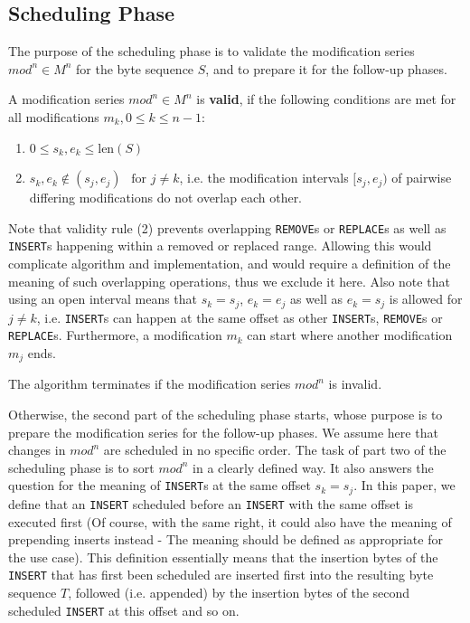 \documentclass[english, 10pt, openright, twocolumn, landscape, twoside, notitlepage, a4paper, pdftex]		
{article}
\begin{document}
\subsection{Scheduling Phase}%
\label{sec:SchedulingPhase}%

The purpose of the scheduling phase is to validate the modification series $mod^{n}\in M^{n}$ for the byte sequence $S$, and to prepare it for the follow-up phases.

A modification series $mod^{n}\in M^{n}$ is \textbf{valid}, if the following conditions are met for all modifications $m_{k}, 0\leq k\leq n-1$:
\begin{enumerate}
\item $0\leq s_{k},e_{k}\leq \text{len}(S)$
\item $s_{k},e_{k}\notin(s_{j}, e_{j})\ \ \text{ for } j\neq k$, i.e. the modification intervals $[s_{j}, e_{j})$ of pairwise differing modifications do not overlap each other.
\end{enumerate}

Note that validity rule (2) prevents overlapping \texttt{REMOVE}s or \texttt{REPLACE}s as well as \texttt{INSERT}s happening within a removed or replaced range. Allowing this would complicate algorithm and implementation, and would require a definition of the meaning of such overlapping operations, thus we exclude it here. Also note that using an open interval means that $s_{k}=s_{j}$, $e_{k}=e_{j}$ as well as $e_{k}=s_{j}$ is allowed for $j\neq k$, i.e. \texttt{INSERT}s can happen at the same offset as other \texttt{INSERT}s, \texttt{REMOVE}s or \texttt{REPLACE}s. Furthermore, a modification $m_{k}$ can start where another modification $m_{j}$ ends.

The algorithm terminates if the modification series $mod^{n}$ is invalid.

Otherwise, the second part of the scheduling phase starts, whose purpose is to prepare the modification series for the follow-up phases. We assume here that changes in $mod^{n}$ are scheduled in no specific order. The task of part two of the scheduling phase is to sort $mod^{n}$ in a clearly defined way. It also answers the question for the meaning of \texttt{INSERT}s at the same offset $s_{k}=s_{j}$. In this paper, we define that an \texttt{INSERT} scheduled before an \texttt{INSERT} with the same offset is executed first (Of course, with the same right, it could also have the meaning of prepending inserts instead - The meaning should be defined as appropriate for the use case). This definition essentially means that the insertion bytes of the \texttt{INSERT} that has first been scheduled are inserted first into the resulting byte sequence $T$, followed (i.e. appended) by the insertion bytes of the second scheduled \texttt{INSERT} at this offset and so on.
\end{document}
